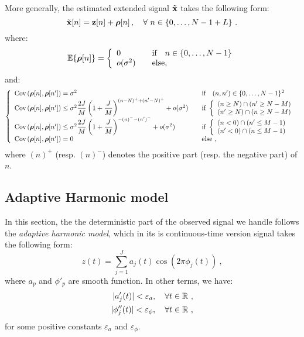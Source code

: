 More generally, the estimated extended signal $\tilde{{\mathbf x}}$  takes the following form:
\begin{equation*}
\tilde{{\mathbf x}}[n] = {\mathbf z}[n] + \boldsymbol{\rho}[n]\,, \quad \forall\ n\in\{0,\dots,N-1+L\}\ .
\end{equation*}
where:
\begin{equation*}
{\mathbb E}\{\boldsymbol{\rho}[n]\} = \left\lbrace
\begin{array}{ll}
0\quad &\mbox{if} \quad n\in\{0,\ldots,N-1\}\\
o(\sigma^2)\quad &\mbox{else,}
\end{array}
\right.
\end{equation*}
and:
\begin{equation*}
\left\lbrace
\begin{array}{ll}
\mbox{Cov}\left(\boldsymbol{\rho}[n],\boldsymbol{\rho}[n']\right) = \sigma^2\quad &\mbox{if} \quad (n,n')\in\{0,\ldots,N-1\}^2\\
\mbox{Cov}\left(\boldsymbol{\rho}[n],\boldsymbol{\rho}[n']\right) \leq \sigma^2\dfrac{2J}{M}\left( 1 + \dfrac{J}{M}\right)^{(n-N)^+ + (n'-N)^+} + o(\sigma^2)\quad &\mbox{if}\ \left\lbrace \begin{array}{l}
(n\geq N)\cap(n'\geq N-M)\\
(n'\geq N)\cap(n\geq N-M) \\
\end{array}
\right. \\
\mbox{Cov}\left(\boldsymbol{\rho}[n],\boldsymbol{\rho}[n']\right) \leq \sigma^2\dfrac{2J}{M}\left( 1 + \dfrac{J}{M}\right)^{-(n)^- -(n')^-} + o(\sigma^2)\quad &\mbox{if}\ \left\lbrace \begin{array}{l}
(n<0)\cap(n'\leq M-1)\\
(n'<0)\cap(n\leq M-1) \\
\end{array}
\right. \\
\mbox{Cov}\left(\boldsymbol{\rho}[n],\boldsymbol{\rho}[n']\right) = 0\quad &\mbox{else}\ ,
\end{array}
\right.
\end{equation*}
where $(n)^+$ (resp. $(n)^-$) denotes the positive part (resp. the negative part) of $n$.

\subsection{Adaptive Harmonic model}
In this section, the the deterministic part of the observed signal we handle follows the \textit{adaptive harmonic model}, which in its is continuous-time version signal takes the following form:
\begin{equation}
z(t) = \sum_{j=1}^J a_j(t)\cos(2\pi\phi_j(t))\ ,
\end{equation}
where $a_p$ and $\phi'_p$ are smooth function. In other terms, we have:
\begin{align}
|a'_j(t)|<\varepsilon_a,\quad\forall t\in{\mathbb R}\ ,\\
|\phi''_j(t)|<\varepsilon_\phi,\quad\forall t\in{\mathbb R}\ ,
\end{align}
for some positive constants $\varepsilon_a$ and $\varepsilon_\phi$.